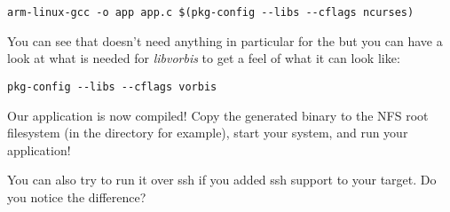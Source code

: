 \begin{verbatim}
arm-linux-gcc -o app app.c $(pkg-config --libs --cflags ncurses)
\end{verbatim}

You can see that  doesn't need anything in particular for the
 but you can have a look at what is needed for
{\em libvorbis} to get a feel of what it can look like:

\begin{verbatim}
pkg-config --libs --cflags vorbis
\end{verbatim}

Our application is now compiled! Copy the generated binary to the NFS
root filesystem (in the  directory for example), start
your system, and run your application!

You can also try to run it over ssh if you added ssh support to your
target. Do you notice the difference?
